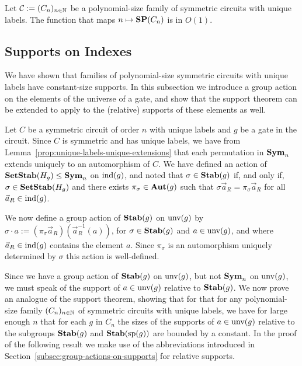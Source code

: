 \documentclass[../paper.tex]{subfiles}
\begin{document}
\begin{cor}
  Let $\mathcal{C} := (C_n)_{n \in \mathbb{N}}$ be a polynomial-size family of
  symmetric circuits with unique labels. The function that maps $n \mapsto
  \text{\textbf{SP}}(C_n) $ is in $O(1)$.
  \label{cor:constant-size-support}
\end{cor}



\subsection{Supports on Indexes}
We have shown that families of polynomial-size symmetric circuits with unique
labels have constant-size supports. In this subsection we introduce a group
action on the elements of the universe of a gate, and show that the support
theorem can be extended to apply to the (relative) supports of these elements as well.

Let $C$ be a symmetric circuit of order $n$ with unique labels and $g$ be a gate
in the circuit. Since $C$ is symmetric and has unique labels, we have from
Lemma~\ref{prop:unique-labels-unique-extensions} that each permutation in $\text{\textbf{Sym}}_n$ extends uniquely to an
automorphism of $C$. We have defined an action of $\text{\textbf{SetStab}}(H_g) \leq \text{\textbf{Sym}}_n$ on
$\text{\upshape ind}(g)$, and noted that $\sigma \in \text{\textbf{Stab}}(g)$ if, and only if, $\sigma \in
\text{\textbf{SetStab}}(H_g)$ and there exists $\pi_{\sigma} \in \text{\textbf{Aut}}(g)$ such that $\sigma
\vec{a}_R = \pi_{\sigma} \vec{a}_R$ for all $\vec{a}_R \in \text{\upshape ind}(g)$.

We now define a group action of $\text{\textbf{Stab}}(g)$ on $\text{unv}(g)$ by $\sigma \cdot a
:= (\pi_{\sigma}\vec{a}_R) (\vec{a}^{-1}_R(a))$, for $\sigma \in \text{\textbf{Stab}}(g)$ and
$a \in \text{unv}(g)$, and where $\vec{a}_R \in \text{\upshape ind}(g)$ contains the element
$a$. Since $\pi_{\sigma}$ is an automorphism uniquely determined by $\sigma$
this action is well-defined.

Since we have a group action of $\text{\textbf{Stab}}(g)$ on $\text{unv}(g)$, but not $\text{\textbf{Sym}}_n$
on $\text{unv}(g)$, we must speak of the support of $a \in \text{unv}(g)$ relative
to $\text{\textbf{Stab}}(g)$. We now prove an analogue of the support theorem, showing that for
that for any polynomial-size family $(C_n)_{n \in \mathbb{N}}$ of symmetric circuits
with unique labels, we have for large enough $n$ that for each $g$ in $C_n$ the
sizes of the supports of $a \in \text{unv}(g)$ relative to the subgroups $\text{\textbf{Stab}}(g)$ and
$\text{\textbf{Stab}} (\text{sp} (g))$ are bounded by a constant. In the proof of the following result we
make use of the abbreviations introduced in Section~\ref{subsec:group-actions-on-supports} for relative supports.
\end{document}
